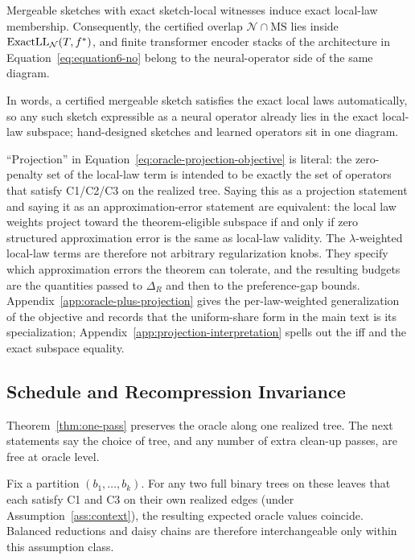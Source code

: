 \begin{proposition}\label{prop:law-constrained-no}
Mergeable sketches with exact sketch-local witnesses induce exact
local-law membership. Consequently, the certified overlap
$\mathcal{N}\cap\mathrm{MS}$ lies inside
$\mathrm{ExactLL}_{\mathcal{N}}(T,f^\ast)$, and finite transformer
encoder stacks of the architecture in Equation~\eqref{eq:equation6-no}
belong to the neural-operator side of the same diagram.
\end{proposition}

In words, a certified mergeable sketch satisfies the exact local laws
automatically, so any such sketch expressible as a neural operator
already lies in the exact local-law subspace; hand-designed sketches and
learned operators sit in one diagram.

``Projection'' in Equation~\eqref{eq:oracle-projection-objective} is
literal: the zero-penalty set
of the local-law term is intended to be exactly the set of operators that
satisfy C1/C2/C3 on the realized tree. Saying this as a projection statement
and saying it as an approximation-error statement are equivalent: the local
law weights project toward the theorem-eligible subspace if and only if
zero structured approximation error is the same as local-law validity.
The $\lambda$-weighted local-law terms are therefore not
arbitrary regularization knobs. They specify which approximation errors
the theorem can tolerate, and the resulting budgets are the quantities
passed to $\Delta_R$ and then to the preference-gap bounds. Appendix~\ref{app:oracle-plus-projection}
gives the per-law-weighted generalization of the objective and records
that the uniform-share form in the main text is its specialization;
Appendix~\ref{app:projection-interpretation}
spells out the iff and the exact subspace equality.

\subsection{Schedule and Recompression Invariance}\label{app:schedule-invariance}

Theorem~\ref{thm:one-pass} preserves the oracle along one realized
tree. The next statements say the choice of tree, and any number of
extra clean-up passes, are free at oracle level.

\begin{corollary}\label{cor:schedule}
Fix a partition $(b_1, \ldots, b_k)$. For any two full binary trees on these leaves that each satisfy C1 and C3 on their own realized edges (under Assumption~\ref{ass:context}), the resulting expected oracle values coincide. Balanced reductions and daisy chains are therefore interchangeable only within this assumption class.
\end{corollary}

